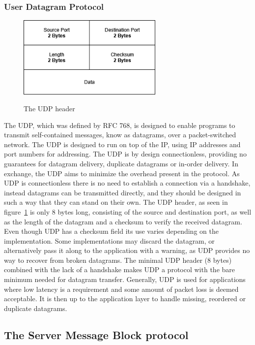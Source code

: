 \documentclass[english, 12pt, a4paper, elec, utf8, a-2b, online]{aaltothesis}
\begin{document}
\subsubsection{User Datagram Protocol \label{UDP}}
\begin{figure}[b]
	\centering
	\includegraphics[alt={A block diagram of the UDP header format, detailing its fields and their sizes.}, height=4cm]{./images/udp_header.png}
	\caption{The UDP header}
	\label{fig:udp_header}
\end{figure}
The UDP, which was defined by RFC 768, is designed to
enable programs to transmit self-contained messages, know as datagrams, over a
packet-switched network. The UDP is designed to run on top of the IP\cite{rfc791},
using IP addresses and port numbers for addressing. The UDP is by design connectionless,
providing no guarantees for datagram delivery, duplicate datagrams or in-order
delivery. In exchange, the UDP aims to minimize the overhead present in the protocol.
As UDP is connectionless there is no need to establish a connection via a handshake,
instead datagrams can be transmitted directly, and they should be designed in
such a way that they can stand on their own. The UDP header, as seen in figure~\ref{fig:udp_header}
is only 8 bytes long,
consisting of the source and destination port, as well as the length of the datagram
and a checksum to verify the received datagram\cite{rfc768}. Even though UDP has
a checksum field its use varies depending on the implementation. Some implementations
may discard the datagram, or alternatively pass it along to the application with a 
warning, as UDP provides no way to recover from broken datagrams\cite{compute_rnetworking}. The minimal UDP
header (8 bytes) combined with the lack of a handshake makes UDP a protocol with
the bare minimum needed for datagram transfer.
Generally, UDP is used for applications where low latency is a requirement and some
amount of packet loss is deemed acceptable. It is then up to the application layer to
handle missing, reordered or duplicate datagrams.
\subsection{The Server Message Block protocol}
\end{document}
